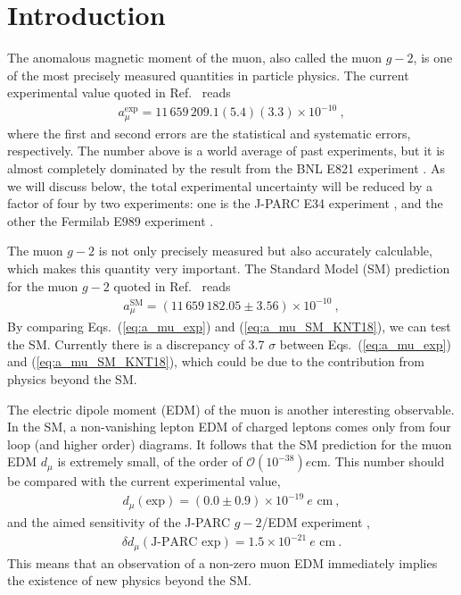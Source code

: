\section{Introduction}

The anomalous magnetic moment of the muon, also called
the muon $g-2$, is one of the most precisely measured
quantities in particle physics.  The current experimental
value quoted in Ref.~\cite{PDG} reads
%
\begin{align}
 a_{\mu}^{\text{exp}}
= 11 \, 659 \, 209.1 (5.4) (3.3) \times 10^{-10} ~,
\label{eq:a_mu_exp}
\end{align}
%
where the first and second errors are the statistical and
systematic errors, respectively.  The number above is a
world average of past experiments, but it is almost completely
dominated by the result from the BNL E821
experiment \cite{Bennett:2006fi}.  
As we will discuss below, the total experimental uncertainty
will be reduced by a factor of four by two experiments: one is 
the J-PARC E34 experiment \cite{TDRsummarypaper}, 
and the other the Fermilab E989 experiment \cite{Grange:2015fou}.

The muon $g-2$ is not only precisely measured but also accurately
calculable, which makes this quantity very important.
The Standard Model (SM) prediction for the muon $g-2$ quoted in
Ref.~\cite{KNT18} reads
%
\begin{align}
 a_{\mu}^{\text{SM}}
= (11 \, 659 \, 182.05 \pm 3.56) \times 10^{-10} ~,
\label{eq:a_mu_SM_KNT18}
\end{align}
%
By comparing Eqs.~(\ref{eq:a_mu_exp}) and (\ref{eq:a_mu_SM_KNT18}),
we can test the SM.  Currently there is a discrepancy of 
3.7 $\sigma$ between Eqs.~(\ref{eq:a_mu_exp}) and (\ref{eq:a_mu_SM_KNT18}), 
which could be due to the contribution from physics beyond the SM. 

The electric dipole moment (EDM) of the muon is another interesting
observable.  In the SM, a non-vanishing lepton EDM of charged leptons
comes only from four loop (and higher order) diagrams.  It follows
that the SM prediction for the muon EDM $d_\mu$ is extremely small,
of the order of ${\mathcal O}(10^{-38}) e \text{cm}$.
This number should be compared with the current experimental
value,
%
\begin{align}
 d_\mu(\text{exp}) = (0.0 \pm 0.9) \times 10^{-19} \ e \text{ cm} ~,
\end{align}
%
and the aimed sensitivity of the J-PARC $g-2$/EDM
experiment \cite{TDRsummarypaper},
%
\begin{align}
 \delta d_\mu(\text{J-PARC exp}) = 1.5 \times 10^{-21} \ e \text{ cm} ~.
\end{align}
%
This means that an observation of a non-zero muon EDM immediately
implies the existence of new physics beyond the SM.  

